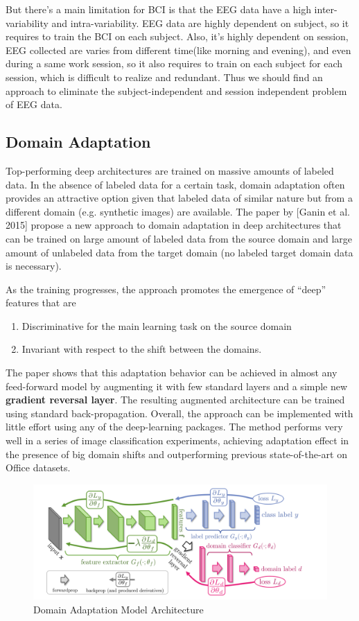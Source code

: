 But there's a main limitation for BCI is that the EEG data have a high inter-variability and intra-variability. EEG data are highly dependent on subject, so it requires to train the BCI on each subject. Also, it's highly dependent on session, EEG collected are varies from different time(like morning and evening), and even during a same work session, so it also requires to train on each subject for each session, which is difficult to realize and redundant. Thus we should find an approach to eliminate the subject-independent and session independent problem of EEG data.

\subsection{Domain Adaptation}
Top-performing deep architectures are trained on massive amounts of labeled data. In the absence of labeled data for a certain task, domain adaptation often provides an attractive option given that labeled data of similar nature but from a different domain (e.g. synthetic images) are available. The paper by [Ganin et al. 2015]\cite{ganin2014unsupervised} propose a new approach to domain adaptation in deep architectures that can be trained on large amount of labeled data from the source domain and large amount of unlabeled data from the target domain (no labeled target domain data is necessary).

As the training progresses, the approach promotes the emergence of “deep” features that are
\begin{enumerate}
	\item Discriminative for the main learning task on the source domain
	\item Invariant with respect to the shift between the domains.
\end{enumerate} 
The paper\cite{ganin2014unsupervised} shows that this adaptation behavior can be achieved in almost any feed-forward model by augmenting it with few standard layers and a simple new \textbf{gradient reversal layer}. The resulting augmented architecture can be trained using standard back-propagation. Overall, the approach can be implemented with little effort using any of the deep-learning packages. The method performs very well in a series of image classification experiments, achieving adaptation effect in the presence of big domain shifts and outperforming previous state-of-the-art on Office datasets.

\begin{figure}[htbp]
	\centering
	\includegraphics[width=15cm]{Figures/domainadaptation.png}
	\caption[Domain Adaptation Model Architecture]{Domain Adaptation Model Architecture}
	\label{fig:domainadaptation}
\end{figure}

